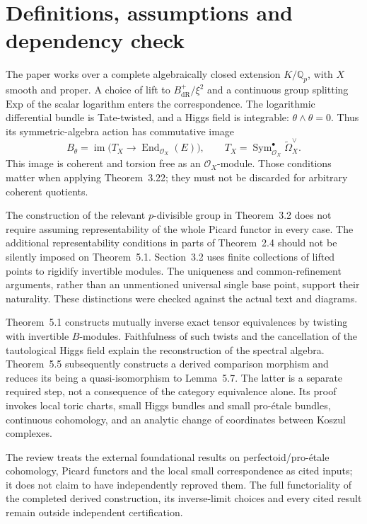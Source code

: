 \documentclass[10pt]{article}
\begin{document}
\section*{Definitions, assumptions and dependency check}
The paper works over a complete algebraically closed extension \(K/\mathbb Q_p\), with \(X\) smooth and proper. A choice of lift to \(B_{\mathrm{dR}}^+/\xi^2\) and a continuous group splitting \(\mathrm{Exp}\) of the scalar logarithm enters the correspondence. The logarithmic differential bundle is Tate-twisted, and a Higgs field is integrable: \(\theta\wedge\theta=0\). Thus its symmetric-algebra action has commutative image \[B_\theta=\operatorname{im}\bigl(T_X\longrightarrow\operatorname{End}_{\mathcal O_X}(E)\bigr),
 \qquad T_X=\operatorname{Sym}_{\mathcal O_X}^{\bullet}\widetilde\Omega_X^\vee.\] This image is coherent and torsion free as an \(\mathcal O_X\)-module. Those conditions matter when applying Theorem 3.22; they must not be discarded for arbitrary coherent quotients.\par
The construction of the relevant \(p\)-divisible group in Theorem 3.2 does not require assuming representability of the whole Picard functor in every case. The additional representability conditions in parts of Theorem 2.4 should not be silently imposed on Theorem 5.1. Section 3.2 uses finite collections of lifted points to rigidify invertible modules. The uniqueness and common-refinement arguments, rather than an unmentioned universal single base point, support their naturality. These distinctions were checked against the actual text and diagrams.\par
Theorem 5.1 constructs mutually inverse exact tensor equivalences by twisting with invertible \(B\)-modules. Faithfulness of such twists and the cancellation of the tautological Higgs field explain the reconstruction of the spectral algebra. Theorem 5.5 subsequently constructs a derived comparison morphism and reduces its being a quasi-isomorphism to Lemma 5.7. The latter is a separate required step, not a consequence of the category equivalence alone. Its proof invokes local toric charts, small Higgs bundles and small pro-étale bundles, continuous cohomology, and an analytic change of coordinates between Koszul complexes.\par
The review treats the external foundational results on perfectoid/pro-étale cohomology, Picard functors and the local small correspondence as cited inputs; it does not claim to have independently reproved them. The full functoriality of the completed derived construction, its inverse-limit choices and every cited result remain outside independent certification.\par
\end{document}
